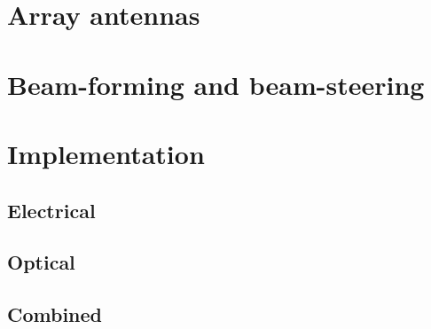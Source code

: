 \documentclass[]{report}
\begin{document}
\section{Array antennas}

\section{Beam-forming and beam-steering}

\section{Implementation}

\subsection{Electrical}

\subsection{Optical}

\subsection{Combined}
\end{document}
